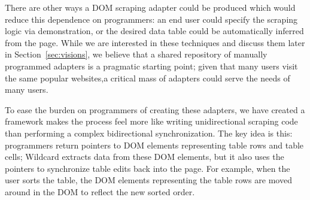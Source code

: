 \documentclass[sigplan,screen,10pt,anonymous,review]{acmart}
\begin{document}
There are other ways a DOM scraping adapter could be produced which
would reduce this dependence on programmers: an end user could specify
the scraping logic via demonstration, or the desired data table could be
automatically inferred from the page. While we are interested in these
techniques and discuss them later in Section~\ref{sec:visions}, we
believe that a shared repository of manually programmed adapters is a
pragmatic starting point; given that many users visit the same popular
websites,a critical mass of adapters could serve the needs of many
users.

To ease the burden on programmers of creating these adapters, we have
created a framework makes the process feel more like writing
unidirectional scraping code than performing a complex bidirectional
synchronization. The key idea is this: programmers return pointers to
DOM elements representing table rows and table cells; Wildcard extracts
data from these DOM elements, but it also uses the pointers to
synchronize table edits back into the page. For example, when the user
sorts the table, the DOM elements representing the table rows are moved
around in the DOM to reflect the new sorted order.
\end{document}
